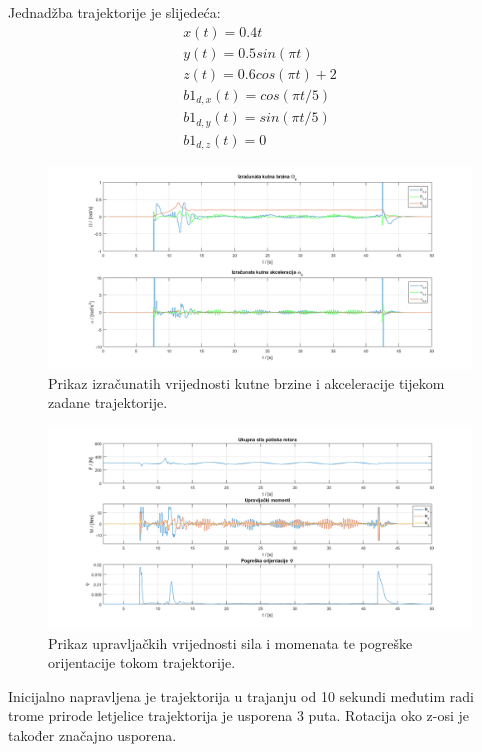 \documentclass[times, utf8, diplomski]{fer}
\begin{document}
	Jednadžba trajektorije je slijedeća:
	\begin{gather}
		x(t) = 0.4t \\
		y(t) = 0.5 sin(\pi t) \\
		z(t) = 0.6 cos(\pi t) + 2 \\
		b1_{d,x}(t) = cos(\pi t / 5) \\
		b1_{d,y}(t) = sin(\pi t / 5) \\
		b1_{d,z}(t) = 0
	\end{gather}
	\begin{figure}[h!]
		\includegraphics[width=\textwidth]{plots/traj_alpha_omega.png}
		\caption{Prikaz izračunatih vrijednosti kutne brzine i akceleracije tijekom zadane trajektorije.}
	\end{figure}
	
	\begin{figure}[h!]
		\includegraphics[width=\textwidth]{plots/traj_force_moments.png}
		\caption{Prikaz upravljačkih vrijednosti sila i momenata te pogreške orijentacije tokom trajektorije.}
	\end{figure}
	
	Inicijalno napravljena je trajektorija u trajanju od 10 sekundi međutim radi trome prirode letjelice trajektorija je usporena 3 puta. Rotacija oko z-osi je također značajno usporena. 
	
\end{document}
